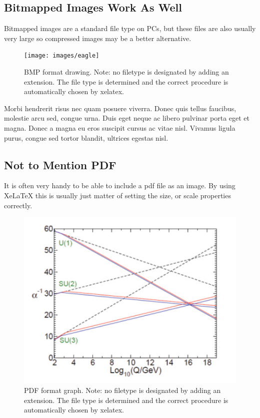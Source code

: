 \subsection{Bitmapped Images Work As Well}

Bitmapped images are a standard file type on PCs, but these files are also usually very large so compressed images may be a better alternative.

\begin{figure}[htbp]
  \centering
    \texttt{[image: images/eagle]}
    \caption[BMP format drawing. Note: no filetype is designated by adding an extension.]{BMP format drawing. Note: no filetype is designated by adding an extension. The file type is determined and the correct procedure is automatically chosen by xelatex.}
\end{figure}

Morbi hendrerit risus nec quam posuere viverra. Donec quis tellus faucibus, molestie arcu sed, congue urna. Duis eget neque ac libero pulvinar porta eget et magna. Donec a magna eu eros suscipit cursus ac vitae nisl. Vivamus ligula purus, congue sed tortor blandit, ultrices egestas nisl.

\subsection{Not to Mention PDF}

It is often very handy to be able to include a pdf file as an image. By using XeLaTeX this is usually just matter of setting the size, or scale properties correctly.

\begin{figure}[htbp]
  \centering
    \includegraphics[scale=1.0]{images/graph.pdf}
    \caption[PDF format graph. Note: no filetype is designated by adding an extension.]{PDF format graph. Note: no filetype is designated by adding an extension. The file type is determined and the correct procedure is automatically chosen by xelatex.}
\end{figure}

